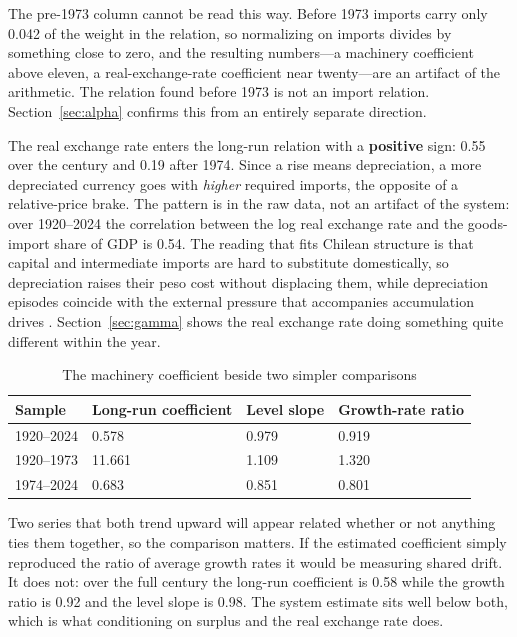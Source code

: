 \documentclass[11pt]{article}
\begin{document}
The pre-1973 column cannot be read this way. Before 1973 imports carry only 0.042 of the weight in the relation, so normalizing on imports divides by something close to zero, and the resulting numbers---a machinery coefficient above eleven, a real-exchange-rate coefficient near twenty---are an artifact of the arithmetic. The relation found before 1973 is not an import relation. Section~\ref{sec:alpha} confirms this from an entirely separate direction.

The real exchange rate enters the long-run relation with a \textbf{positive} sign: 0.55 over the century and 0.19 after 1974. Since a rise means depreciation, a more depreciated currency goes with \emph{higher} required imports, the opposite of a relative-price brake. The pattern is in the raw data, not an artifact of the system: over 1920--2024 the correlation between the log real exchange rate and the goods-import share of GDP is 0.54. The reading that fits Chilean structure is that capital and intermediate imports are hard to substitute domestically, so depreciation raises their peso cost without displacing them, while depreciation episodes coincide with the external pressure that accompanies accumulation drives \citep{albala2006,palma2019}. Section~\ref{sec:gamma} shows the real exchange rate doing something quite different within the year.

\begin{table}[H]
\centering
\caption{The machinery coefficient beside two simpler comparisons}
\begin{tabular}{p{2.6cm}p{3.4cm}p{3.4cm}p{4.0cm}}
\toprule
\textbf{Sample} & \textbf{Long-run coefficient} & \textbf{Level slope} & \textbf{Growth-rate ratio} \\
\midrule
1920--2024 & 0.578 & 0.979 & 0.919 \\
1920--1973 & 11.661 & 1.109 & 1.320 \\
1974--2024 & 0.683 & 0.851 & 0.801 \\
\bottomrule
\end{tabular}
\end{table}

Two series that both trend upward will appear related whether or not anything ties them together, so the comparison matters. If the estimated coefficient simply reproduced the ratio of average growth rates it would be measuring shared drift. It does not: over the full century the long-run coefficient is 0.58 while the growth ratio is 0.92 and the level slope is 0.98. The system estimate sits well below both, which is what conditioning on surplus and the real exchange rate does.
\end{document}
